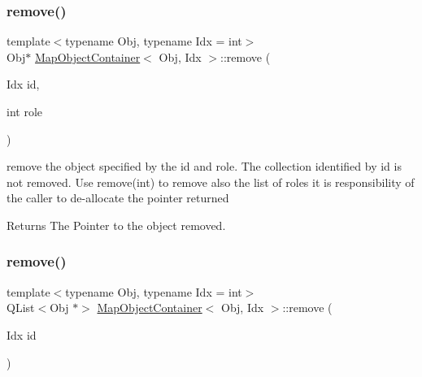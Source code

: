 \mbox{\label{class_map_object_container_a679fb7116afc538894fefb7bf3fc87fb}} 
\subsubsection{\texorpdfstring{remove()}{remove()}\hspace{0.1cm}{\footnotesize\ttfamily [1/2]}}
{\footnotesize\ttfamily template$<$typename Obj, typename Idx = int$>$ \\
Obj$\ast$ \mbox{\hyperlink{class_map_object_container}{Map\+Object\+Container}}$<$ Obj, Idx $>$\+::remove (\begin{DoxyParamCaption}\item[{Idx}]{id,  }\item[{int}]{role }\end{DoxyParamCaption})\hspace{0.3cm}{\ttfamily [inline]}}



remove the object specified by the id and role. The collection identified by id is not removed. Use remove(int) to remove also the list of roles it is responsibility of the caller to de-\/allocate the pointer returned 

\begin{DoxyReturn}{Returns}
The Pointer to the object removed. 
\end{DoxyReturn}
\mbox{\label{class_map_object_container_a6b62353d4b08a46f1624b5407c425375}} 
\subsubsection{\texorpdfstring{remove()}{remove()}\hspace{0.1cm}{\footnotesize\ttfamily [2/2]}}
{\footnotesize\ttfamily template$<$typename Obj, typename Idx = int$>$ \\
Q\+List$<$Obj $\ast$$>$ \mbox{\hyperlink{class_map_object_container}{Map\+Object\+Container}}$<$ Obj, Idx $>$\+::remove (\begin{DoxyParamCaption}\item[{Idx}]{id }\end{DoxyParamCaption})\hspace{0.3cm}{\ttfamily [inline]}}



